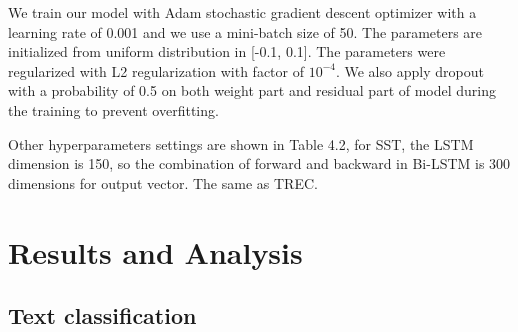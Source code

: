 \documentclass[senior]{IPSstyle}
\begin{document}
We train our model with Adam stochastic gradient descent optimizer with a learning rate of 0.001 and we use a mini-batch size of 50. The parameters are initialized from uniform distribution in [-0.1, 0.1]. The parameters were regularized with L2 regularization with factor of $10^{-4}$. We also apply dropout\cite{hinton2012improving} with a probability of 0.5 on both weight part and residual part of model during the training to prevent overfitting.

Other hyperparameters settings are shown in Table 4.2, for SST, the LSTM dimension is 150, so the combination of forward and backward in Bi-LSTM is 300 dimensions for output vector. The same as TREC.







\section{Results and Analysis}
\subsection{Text classification}
\end{document}
